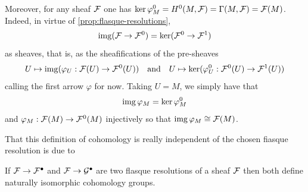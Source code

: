 Moreover, for any sheaf $\mathcal{F}$ one has $\ker\varphi_M^0=H^0(M,\mathcal{F})=\Gamma(M,\mathcal{F})=\mathcal{F}(M)$. Indeed, in virtue of \cref{prop:flasque-resolutions}, \[\operatorname{img}(\mathcal{F}\to\mathcal{F}^0)=\ker(\mathcal{F}^0\to\mathcal{F}^1)\]
as sheaves, that is, as the sheafifications of the pre-sheaves
\[U\mapsto\operatorname{img} (\varphi_U:\mathcal{F}(U)\to\mathcal{F}^0(U))\quad \text{and}\quad U\mapsto\ker(\varphi^0_U:\mathcal{F}^0(U)\to\mathcal{F}^1(U))\]
calling the first arrow $\varphi$ for now. Taking $U=M$, we simply have that
\[\operatorname{img}\varphi_M=\ker\varphi^0_M\]
and $\varphi_M:\mathcal{F}(M)\to\mathcal{F}^0(M)$ injectively so that $\operatorname{img}\varphi_M\cong\mathcal{F}(M)$.

That this definition of cohomology is really independent of the chosen fiasque resolution is due to
\begin{prop}
	If $\mathcal{F}\to\mathcal{F}^\bullet$ and $\mathcal{F}\to\mathcal{G}^\bullet$ are two flasque resolutions of a sheaf $\mathcal{F}$ then both define naturally isomorphic cohomology groups.
\end{prop}

